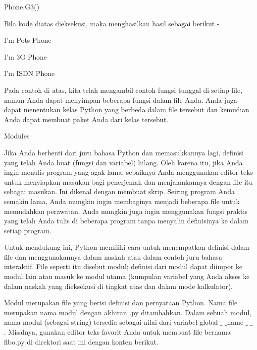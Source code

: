 \noindent 
 \hspace*{0.5in} Phone.G3() \par
\noindent 
Bila kode diatas dieksekusi, maka menghasilkan hasil sebagai berikut - \par
\noindent 
 \hspace*{0.5in} I'm Pots Phone \par
\noindent 
 \hspace*{0.5in} I'm 3G Phone \par
\noindent 
 \hspace*{0.5in} I'm ISDN Phone \par
\noindent 
Pada contoh di atas, kita telah mengambil contoh fungsi tunggal di setiap file, namun Anda dapat menyimpan beberapa fungsi dalam file Anda. Anda juga dapat menentukan kelas Python yang berbeda dalam file tersebut dan kemudian Anda dapat membuat paket Anda dari kelas tersebut. \par
\vspace{12pt}
\noindent 
Modules \par
\noindent 
Jika Anda berhenti dari juru bahasa Python dan memasukkannya lagi, definisi yang telah Anda buat (fungsi dan variabel) hilang. Oleh karena itu, jika Anda ingin menulis program yang agak lama, sebaiknya Anda menggunakan editor teks untuk menyiapkan masukan bagi penerjemah dan menjalankannya dengan file itu sebagai masukan. Ini dikenal dengan membuat skrip. Seiring program Anda semakin lama, Anda mungkin ingin membaginya menjadi beberapa file untuk memudahkan perawatan. Anda mungkin juga ingin menggunakan fungsi praktis yang telah Anda tulis di beberapa program tanpa menyalin definisinya ke dalam setiap program. \par
\noindent 
Untuk mendukung ini, Python memiliki cara untuk menempatkan definisi dalam file dan menggunakannya dalam naskah atau dalam contoh juru bahasa interaktif. File seperti itu disebut modul; definisi dari modul dapat diimpor ke modul lain atau masuk ke modul utama (kumpulan variabel yang Anda akses ke dalam naskah yang dieksekusi di tingkat atas dan dalam mode kalkulator). \par
\noindent 
Modul merupakan file yang berisi definisi dan pernyataan Python. Nama file merupakan nama modul dengan akhiran .py ditambahkan. Dalam sebuah modul, nama modul (sebagai string) tersedia sebagai nilai dari variabel global  $  \_  $ $  \_  $name $  \_  $ $  \_  $. Misalnya, gunakan editor teks favorit Anda untuk membuat file bernama fibo.py di direktori saat ini dengan konten berikut. \par
